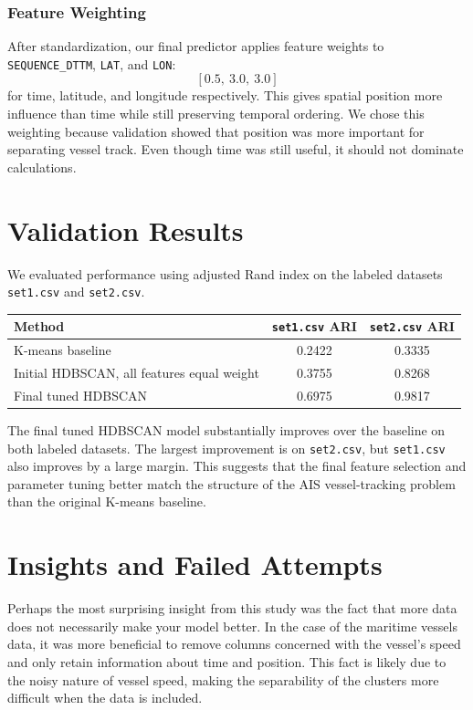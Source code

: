 \documentclass[12pt]{fphw}
\begin{document}
\subsubsection*{Feature Weighting} After standardization, our final predictor applies feature weights to \texttt{SEQUENCE\_DTTM}, \texttt{LAT}, and \texttt{LON}:
\[
[0.5,\ 3.0,\ 3.0]
\]
for time, latitude, and longitude respectively. This gives spatial position more influence than time while still preserving temporal ordering. We chose this weighting because validation showed that position was more important for separating vessel track. Even though time was still useful, it should not dominate calculations.


\section*{Validation Results}
We evaluated performance using adjusted Rand index on the labeled datasets \texttt{set1.csv} and \texttt{set2.csv}.

\begin{center}
\begin{tabular}{lcc}
\toprule
Method & \texttt{set1.csv} ARI & \texttt{set2.csv} ARI \\
\midrule
K-means baseline & 0.2422 & 0.3335 \\
Initial HDBSCAN, all features equal weight & 0.3755 & 0.8268 \\
Final tuned HDBSCAN & 0.6975 & 0.9817 \\
\bottomrule
\end{tabular}
\end{center}

The final tuned HDBSCAN model substantially improves over the baseline on both labeled datasets. The largest improvement is on \texttt{set2.csv}, but \texttt{set1.csv} also improves by a large margin. This suggests that the final feature selection and parameter tuning better match the structure of the AIS vessel-tracking problem than the original K-means baseline.

\section*{Insights and Failed Attempts}

Perhaps the most surprising insight from this study was the fact that more data does not necessarily make your model better. In the case of the maritime vessels data, it was more beneficial to remove columns concerned with the vessel's speed and only retain information about time and position. 
This fact is likely due to the noisy nature of vessel speed, making the separability of the clusters more difficult when the data is included. 
\end{document}
